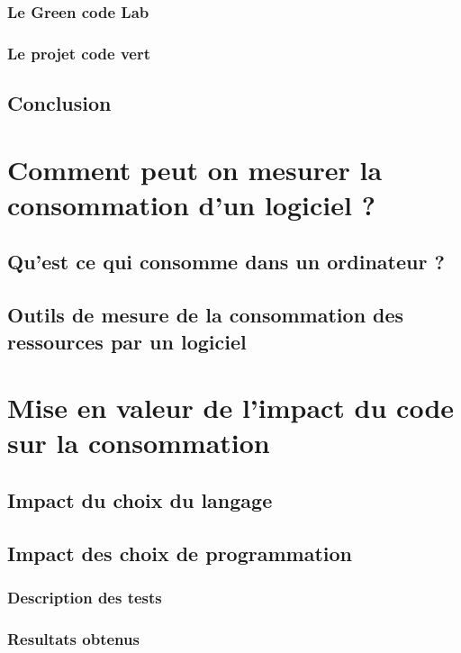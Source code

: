 \documentclass[a4paper, 11pt]{report}
\begin{document}
		\subsection{Le Green code Lab}
		\subsection{Le projet code vert}
		
	\section{Conclusion}

\chapter{Comment peut on mesurer la consommation d'un logiciel ?}
	\section{Qu'est ce qui consomme dans un ordinateur ?}
	\section{Outils de mesure de la consommation des ressources par un logiciel}

\chapter{Mise en valeur de l'impact du code sur la consommation}
	\section{Impact du choix du langage}
	\section{Impact des choix de programmation}
		\subsection{Description des tests}
		\subsection{Resultats obtenus}
\end{document}
